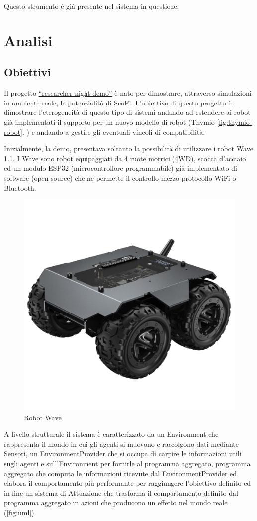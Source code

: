 \documentclass[12pt,a4paper,openright,twoside]{book}
\begin{document}
Questo strumento è già presente nel sistema in questione.

\chapter{Analisi}
\label{chap:analisi}

\section{Obiettivi}
Il progetto \href{https://github.com/cric96/researcher-night-demo.git}{``researcher-night-demo''} è nato per dimostrare, attraverso simulazioni in ambiente reale, le potenzialità di ScaFi. L'obiettivo di questo progetto è dimostrare l'eterogeneità di questo tipo di sistemi andando ad estendere ai robot già implementati il supporto per un nuovo modello di robot (Thymio \cref{fig:thymio-robot}. ) e andando a gestire gli eventuali vincoli di compatibilità.

Inizialmente, la demo, presentava soltanto la possibilità di utilizzare i robot Wave \cref{fig:wave-robot}. I Wave sono robot equipaggiati da 4 ruote motrici (4WD), scocca d'acciaio ed un modulo ESP32 (microcontrollore programmabile) già implementato di software (open-source) che ne permette il controllo mezzo protocollo WiFi o Bluetooth.

\begin{figure}
    \centering
    \includegraphics[width=.3\linewidth]{figures/wave-robot.jpg}
    \caption{Robot Wave}
    \label{fig:wave-robot}
\end{figure}

A livello strutturale il sistema è caratterizzato da un Environment che rappresenta il mondo in cui gli agenti si muovono e raccolgono dati mediante Sensori, un EnvironmentProvider che si occupa di carpire le informazioni utili sugli agenti e sull'Environment per fornirle al programma aggregato, programma aggregato che computa le informazioni ricevute dal EnvironmentProvider ed elabora il comportamento più performante per raggiungere l'obiettivo definito ed in fine un sistema di Attuazione che trasforma il comportamento definito dal programma aggregato in azioni che producono un effetto nel mondo reale (\cref{fig:uml}).
\end{document}
